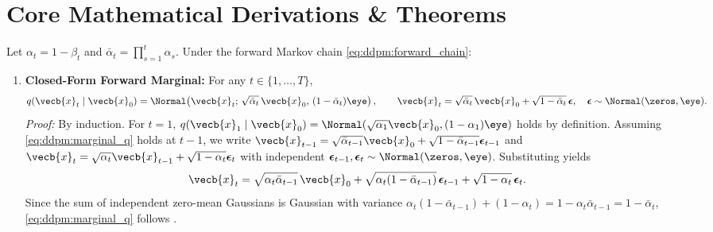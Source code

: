 \documentclass[../../../../master.tex]{subfiles}
\begin{document}
\section{Core Mathematical Derivations \& Theorems}\label{sec:ddpm:derivations}

\begin{coremath}
\label{thm:ddpm:forward_reverse}
Let $\alpha_t = 1 - \beta_t$ and $\bar{\alpha}_t = \prod_{s=1}^t \alpha_s$. Under the forward Markov chain \eqref{eq:ddpm:forward_chain}:
\begin{enumerate}
  \item \textbf{Closed-Form Forward Marginal:} For any $t \in \{1,\dots,T\}$,
  \begin{equation}\label{eq:ddpm:marginal_q}
    q(\vecb{x}_t \mid \vecb{x}_0) = \Normal\!\left(\vecb{x}_t;\, \sqrt{\bar{\alpha}_t}\,\vecb{x}_0,\, (1 - \bar{\alpha}_t)\eye\right), \qquad \vecb{x}_t = \sqrt{\bar{\alpha}_t}\,\vecb{x}_0 + \sqrt{1 - \bar{\alpha}_t}\,\boldsymbol{\epsilon}, \quad \boldsymbol{\epsilon} \sim \Normal(\zeros, \eye).
  \end{equation}
  \emph{Proof:} By induction. For $t=1$, $q(\vecb{x}_1 \mid \vecb{x}_0) = \Normal(\sqrt{\alpha_1}\vecb{x}_0, (1-\alpha_1)\eye)$ holds by definition. Assuming \eqref{eq:ddpm:marginal_q} holds at $t-1$, we write $\vecb{x}_{t-1} = \sqrt{\bar{\alpha}_{t-1}}\vecb{x}_0 + \sqrt{1-\bar{\alpha}_{t-1}}\boldsymbol{\epsilon}_{t-1}$ and $\vecb{x}_t = \sqrt{\alpha_t}\vecb{x}_{t-1} + \sqrt{1-\alpha_t}\boldsymbol{\epsilon}_t$ with independent $\boldsymbol{\epsilon}_{t-1}, \boldsymbol{\epsilon}_t \sim \Normal(\zeros, \eye)$. Substituting yields
  \[
    \vecb{x}_t = \sqrt{\alpha_t \bar{\alpha}_{t-1}}\,\vecb{x}_0 + \sqrt{\alpha_t(1 - \bar{\alpha}_{t-1})}\,\boldsymbol{\epsilon}_{t-1} + \sqrt{1-\alpha_t}\,\boldsymbol{\epsilon}_t.
  \]
  Since the sum of independent zero-mean Gaussians is Gaussian with variance $\alpha_t(1-\bar{\alpha}_{t-1}) + (1-\alpha_t) = 1 - \alpha_t\bar{\alpha}_{t-1} = 1 - \bar{\alpha}_t$, \eqref{eq:ddpm:marginal_q} follows  .


\end{enumerate}
\end{coremath}
\end{document}
